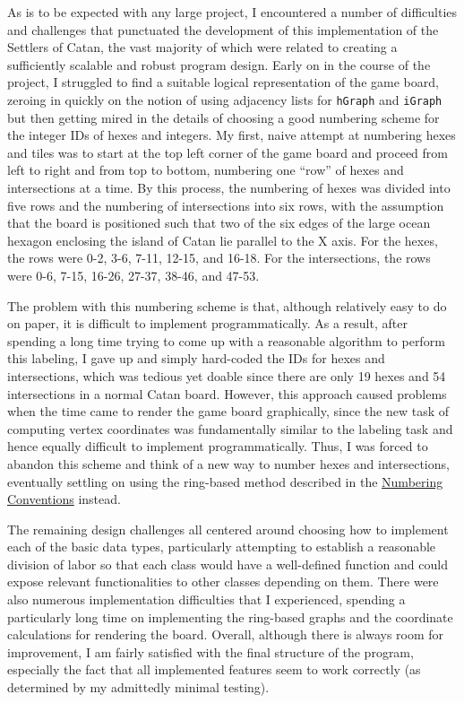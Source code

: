 \documentclass[pageno]{jpaper}
\begin{document}
\begin{doublespacing}
As is to be expected with any large project, I encountered a number of difficulties and challenges that punctuated the development of this implementation of the Settlers of Catan, the vast majority of which were related to creating a sufficiently scalable and robust program design. Early on in the course of the project, I struggled to find a suitable logical representation of the game board, zeroing in quickly on the notion of using adjacency lists for \lstinline$hGraph$ and \lstinline$iGraph$ but then getting mired in the details of choosing a good numbering scheme for the integer IDs of hexes and integers. My first, naive attempt at numbering hexes and tiles was to start at the top left corner of the game board and proceed from left to right and from top to bottom, numbering one “row” of hexes and intersections at a time. By this process, the numbering of hexes was divided into five rows and the numbering of intersections into six rows, with the assumption that the board is positioned such that two of the six edges of the large ocean hexagon enclosing the island of Catan lie parallel to the X axis. For the hexes, the rows were 0-2, 3-6, 7-11, 12-15, and 16-18. For the intersections, the rows were 0-6, 7-15, 16-26, 27-37, 38-46, and 47-53. 

The problem with this numbering scheme is that, although relatively easy to do on paper, it is difficult to implement programmatically. As a result, after spending a long time trying to come up with a reasonable algorithm to perform this labeling, I gave up and simply hard-coded the IDs for hexes and intersections, which was tedious yet doable since there are only 19 hexes and 54 intersections in a normal Catan board. However, this approach caused problems when the time came to render the game board graphically, since the new task of computing vertex coordinates was fundamentally similar to the labeling task and hence equally difficult to implement programmatically. Thus, I was forced to abandon this scheme and think of a new way to number hexes and intersections, eventually settling on using the ring-based method described in the \hyperlink{sec:numbering_conventions}{Numbering Conventions} instead.

The remaining design challenges all centered around choosing how to implement each of the basic data types, particularly attempting to establish a reasonable division of labor so that each class would have a well-defined function and could expose relevant functionalities to other classes depending on them. There were also numerous implementation difficulties that I experienced, spending a particularly long time on implementing the ring-based graphs and the coordinate calculations for rendering the board. Overall, although there is always room for improvement, I am fairly satisfied with the final structure of the program, especially the fact that all implemented features seem to work correctly (as determined by my admittedly minimal testing). 


\end{doublespacing}
\end{document}
